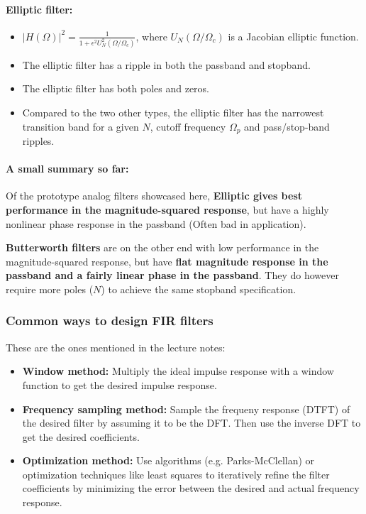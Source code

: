 \documentclass{article}
\begin{document}
\paragraph{Elliptic filter:}
\begin{itemize}
    \item $|H(\Omega)|^2 = \frac{1}{1 + \epsilon^2 U_N^2 (\Omega / \Omega_c ) }$, where $U_N(\Omega / \Omega_c)$ is a Jacobian elliptic function.
    \item The elliptic filter has a ripple in both the passband and stopband.
    \item The elliptic filter has both poles and zeros.
    \item Compared to the two other types, the elliptic filter has the narrowest transition band for a given $N$, cutoff frequency $\Omega_p$ and pass/stop-band ripples.
\end{itemize}

\paragraph{A small summary so far:}
Of the prototype analog filters showcased here, \textbf{Elliptic gives best performance in the magnitude-squared response}, but have a highly nonlinear phase response in the passband (Often bad in application). 

\textbf{Butterworth filters} are on the other end with low performance in the magnitude-squared response, but have \textbf{flat magnitude response in the passband and a fairly linear phase in the passband}. They do however require more poles ($N$) to achieve the same stopband specification.


\subsubsection{Common ways to design FIR filters}
These are the ones mentioned in the lecture notes:
\begin{itemize}
    \item \textbf{Window method:} Multiply the ideal impulse response with a window function to get the desired impulse response.
    \item \textbf{Frequency sampling method:} Sample the frequeny response (DTFT) of the desired filter by assuming it to be the DFT. Then use the inverse DFT to get the desired coefficients.
    \item \textbf{Optimization method:} Use algorithms (e.g. Parks-McClellan) or optimization techniques like least squares to iteratively refine the filter coefficients by minimizing the error between the desired and actual frequency response.
\end{itemize}
\end{document}
